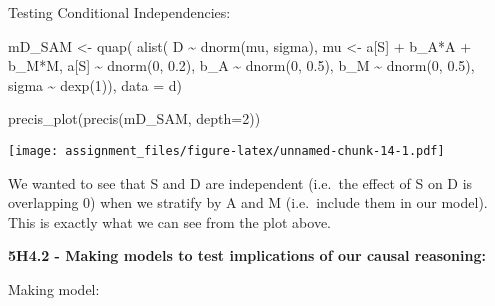 \documentclass[
]{article}
\newenvironment{Shaded}{\begin{snugshade}}{\end{snugshade}}
\newcommand{\AttributeTok}[1]{\textcolor[rgb]{0.77,0.63,0.00}{#1}}
\newcommand{\DecValTok}[1]{\textcolor[rgb]{0.00,0.00,0.81}{#1}}
\newcommand{\FloatTok}[1]{\textcolor[rgb]{0.00,0.00,0.81}{#1}}
\newcommand{\FunctionTok}[1]{\textcolor[rgb]{0.00,0.00,0.00}{#1}}
\newcommand{\NormalTok}[1]{#1}
\newcommand{\OtherTok}[1]{\textcolor[rgb]{0.56,0.35,0.01}{#1}}
\newcommand{\SpecialCharTok}[1]{\textcolor[rgb]{0.00,0.00,0.00}{#1}}
\begin{document}
Testing Conditional Independencies:

\begin{Shaded}
\begin{Highlighting}[]
\NormalTok{mD\_SAM }\OtherTok{\textless{}{-}} \FunctionTok{quap}\NormalTok{(}
  \FunctionTok{alist}\NormalTok{(}
\NormalTok{   D }\SpecialCharTok{\textasciitilde{}} \FunctionTok{dnorm}\NormalTok{(mu, sigma),}
\NormalTok{   mu }\OtherTok{\textless{}{-}}\NormalTok{ a[S] }\SpecialCharTok{+}\NormalTok{ b\_A}\SpecialCharTok{*}\NormalTok{A }\SpecialCharTok{+}\NormalTok{ b\_M}\SpecialCharTok{*}\NormalTok{M,}
\NormalTok{   a[S] }\SpecialCharTok{\textasciitilde{}} \FunctionTok{dnorm}\NormalTok{(}\DecValTok{0}\NormalTok{, }\FloatTok{0.2}\NormalTok{),}
\NormalTok{   b\_A }\SpecialCharTok{\textasciitilde{}} \FunctionTok{dnorm}\NormalTok{(}\DecValTok{0}\NormalTok{, }\FloatTok{0.5}\NormalTok{),}
\NormalTok{   b\_M }\SpecialCharTok{\textasciitilde{}} \FunctionTok{dnorm}\NormalTok{(}\DecValTok{0}\NormalTok{, }\FloatTok{0.5}\NormalTok{),}
\NormalTok{   sigma }\SpecialCharTok{\textasciitilde{}} \FunctionTok{dexp}\NormalTok{(}\DecValTok{1}\NormalTok{)), }\AttributeTok{data =}\NormalTok{ d)}

\FunctionTok{precis\_plot}\NormalTok{(}\FunctionTok{precis}\NormalTok{(mD\_SAM, }\AttributeTok{depth=}\DecValTok{2}\NormalTok{))}
\end{Highlighting}
\end{Shaded}

\texttt{[image: assignment\_files/figure-latex/unnamed-chunk-14-1.pdf]}

We wanted to see that S and D are independent (i.e.~the effect of S on D
is overlapping 0) when we stratify by A and M (i.e.~include them in our
model). This is exactly what we can see from the plot above.

\textbf{5H4.2 - Making models to test implications of our causal
reasoning:}

Making model:
\end{document}
